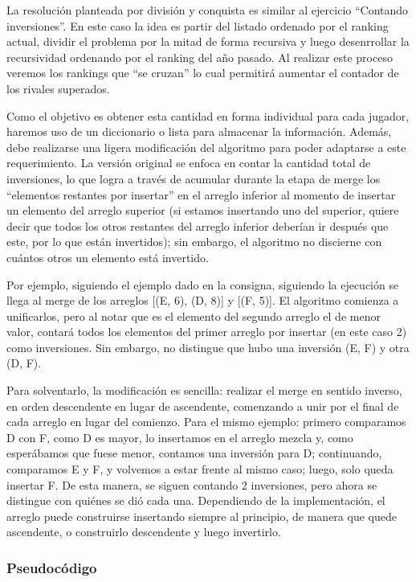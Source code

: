 \documentclass[titlepage,a4paper]{article}
\begin{document}
La resolución planteada por división y conquista es similar al ejercicio “Contando inversiones”. En este caso la idea es partir del listado ordenado por el ranking actual, dividir el problema por la mitad de forma recursiva y luego desenrrollar la recursividad ordenando por el ranking del año pasado. Al realizar este proceso veremos los rankings que “se cruzan” lo cual permitirá aumentar el contador de los rivales superados.

Como el objetivo es obtener esta cantidad en forma individual para cada jugador, haremos uso de un diccionario o lista para almacenar la información. Además, debe realizarse una ligera modificación del algoritmo para poder adaptarse a este requerimiento. La versión original se enfoca en contar la cantidad total de inversiones, lo que logra a través de acumular durante la etapa de merge los “elementos restantes por insertar” en el arreglo inferior al momento de insertar un elemento del arreglo superior (si estamos insertando uno del superior, quiere decir que todos los otros restantes del arreglo inferior deberían ir después que este, por lo que están invertidos); sin embargo, el algoritmo no discierne con cuántos otros un elemento está invertido.

Por ejemplo, siguiendo el ejemplo dado en la consigna, siguiendo la ejecución se llega al merge de los arreglos [(E, 6), (D, 8)] y [(F, 5)]. El algoritmo comienza a unificarlos, pero al notar que es el elemento del segundo arreglo el de menor valor, contará todos los elementos del primer arreglo por insertar (en este caso 2) como inversiones. Sin embargo, no distingue que hubo una inversión (E, F) y otra (D, F).

Para solventarlo, la modificación es sencilla: realizar el merge en sentido inverso, en orden descendente en lugar de ascendente, comenzando a unir por el final de cada arreglo en lugar del comienzo. Para el mismo ejemplo: primero comparamos D con F, como D es mayor, lo insertamos en el arreglo mezcla y, como esperábamos que fuese menor, contamos una inversión para D; continuando, comparamos E y F, y volvemos a estar frente al mismo caso; luego, solo queda insertar F. De esta manera, se siguen contando 2 inversiones, pero ahora se distingue con quiénes se dió cada una. Dependiendo de la implementación, el arreglo puede construirse insertando siempre al principio, de manera que quede ascendente, o construirlo descendente y luego invertirlo.

\subsubsection{Pseudocódigo}
\label{sec:org78eb092}
\end{document}
